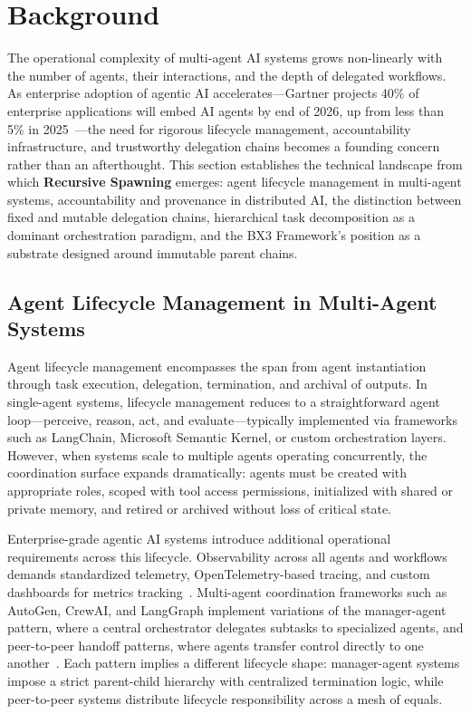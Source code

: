\section{Background}

The operational complexity of multi-agent AI systems grows non-linearly with the number of agents, their interactions, and the depth of delegated workflows. As enterprise adoption of agentic AI accelerates—Gartner projects 40\% of enterprise applications will embed AI agents by end of 2026, up from less than 5\% in 2025~\cite{plainlanguage_8layer}—the need for rigorous lifecycle management, accountability infrastructure, and trustworthy delegation chains becomes a founding concern rather than an afterthought. This section establishes the technical landscape from which \textbf{Recursive Spawning} emerges: agent lifecycle management in multi-agent systems, accountability and provenance in distributed AI, the distinction between fixed and mutable delegation chains, hierarchical task decomposition as a dominant orchestration paradigm, and the BX3 Framework's position as a substrate designed around immutable parent chains.

\subsection{Agent Lifecycle Management in Multi-Agent Systems}

Agent lifecycle management encompasses the span from agent instantiation through task execution, delegation, termination, and archival of outputs. In single-agent systems, lifecycle management reduces to a straightforward agent loop—perceive, reason, act, and evaluate—typically implemented via frameworks such as LangChain, Microsoft Semantic Kernel, or custom orchestration layers. However, when systems scale to multiple agents operating concurrently, the coordination surface expands dramatically: agents must be created with appropriate roles, scoped with tool access permissions, initialized with shared or private memory, and retired or archived without loss of critical state.

Enterprise-grade agentic AI systems introduce additional operational requirements across this lifecycle. Observability across all agents and workflows demands standardized telemetry, OpenTelemetry-based tracing, and custom dashboards for metrics tracking~\cite{infosys_agentic}. Multi-agent coordination frameworks such as AutoGen, CrewAI, and LangGraph implement variations of the manager-agent pattern, where a central orchestrator delegates subtasks to specialized agents, and peer-to-peer handoff patterns, where agents transfer control directly to one another~\cite{linkedin_buchi}. Each pattern implies a different lifecycle shape: manager-agent systems impose a strict parent-child hierarchy with centralized termination logic, while peer-to-peer systems distribute lifecycle responsibility across a mesh of equals.

